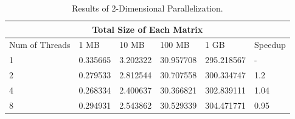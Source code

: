 \documentclass[12pt]{article}
\numberwithin{equation}{section}
\numberwithin{table}{section}
\numberwithin{figure}{section}
\begin{document}
\def\arraystretch{1.3}
\begin{table}
	\centering
	\begin{tabular}{ |p{3cm}||p{2cm}|p{2cm}|p{2cm}|p{2cm}|p{1.5cm}|  }
		
		\hline
		\multicolumn{6}{|c|}{Total Size of Each Matrix} \\
		\hline
		Num of Threads & 1 MB & 10 MB & 100 MB & 1 GB & Speedup\\
		\hline
		1   & 0.335665    &3.202322 &   30.957708 &   295.218567&   -\\
		2   & 0.279533    &2.812544  &  30.707558 &   300.334747  &   1.2\\
		4   & 0.268334     &2.400637 &   30.366821 &   302.839111&   1.04\\
		8   & 0.294931    &2.543862&   30.529339  &   304.471771&   0.95\\
		\hline
	\end{tabular}
	\caption{Results of 2-Dimensional Parallelization.}
	\label{figsolplot}
\end{table}
\end{document}
